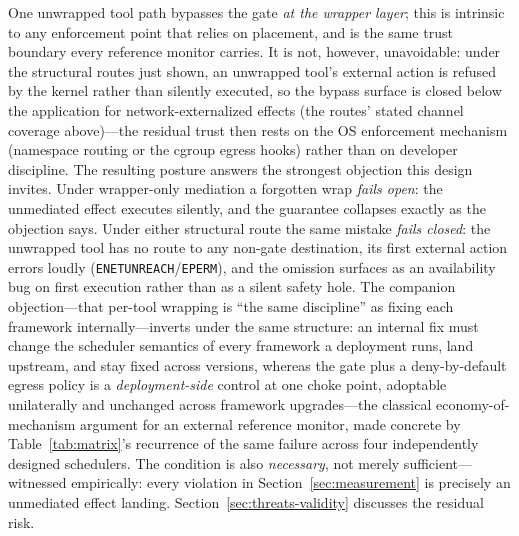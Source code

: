\documentclass[10pt,journal,compsoc]{IEEEtran}
\begin{document}
\smallskip\noindent One unwrapped tool path bypasses the
gate \emph{at the wrapper layer}; this is intrinsic to any enforcement point
that relies on placement, and is the same
trust boundary every reference monitor carries. It is not, however,
unavoidable: under the structural routes just shown, an unwrapped tool's
external action is refused by the kernel rather than silently executed, so the
bypass surface is closed below the application for network-externalized
effects (the routes' stated channel coverage above)---the residual trust
then rests on the OS enforcement mechanism (namespace routing or the
cgroup egress hooks) rather than on developer discipline. The resulting posture answers the strongest objection this design
invites. Under wrapper-only mediation a forgotten wrap
\emph{fails open}: the unmediated effect executes silently, and the guarantee
collapses exactly as the objection says. Under either structural route the
same mistake \emph{fails closed}: the unwrapped tool has no route to any
non-gate destination, its first external action errors loudly
(\texttt{ENETUNREACH}/\texttt{EPERM}), and the omission surfaces as an
availability bug on first execution rather than as a silent safety hole. The
companion objection---that per-tool wrapping is ``the same discipline'' as
fixing each framework internally---inverts under the same structure: an
internal fix must change the scheduler semantics of every framework a
deployment runs, land upstream, and stay fixed across versions, whereas the
gate plus a deny-by-default egress policy is a \emph{deployment-side} control
at one choke point, adoptable unilaterally and unchanged across framework
upgrades---the classical economy-of-mechanism argument for an external
reference monitor, made concrete by Table~\ref{tab:matrix}'s recurrence of
the same failure across four independently designed schedulers. The condition is also
\emph{necessary}, not merely sufficient---witnessed empirically: every
violation in Section~\ref{sec:measurement} is precisely an unmediated effect
landing.
Section~\ref{sec:threats-validity} discusses the residual risk.
\end{document}
